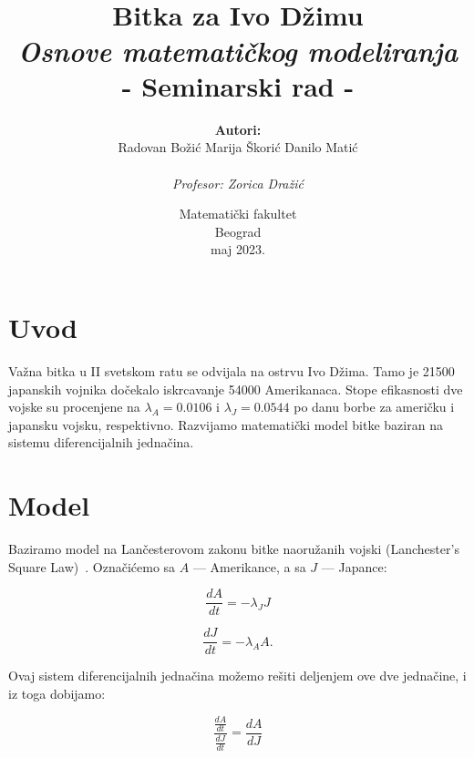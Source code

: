 \documentclass{article}
\title{ \normalsize \textsc{}
		\\ [2.0cm]
    \HRule{1.5pt} \\ [0.5cm]
		\LARGE \textbf{{Bitka za Ivo Džimu}}
    \HRule{1.5pt} \\[5pt] 
        \textit{Osnove matematičkog modeliranja} \\
        {- Seminarski rad -}\vspace*{9\baselineskip}
		}
\date{Matematički fakultet \\ Beograd \\ maj 2023.}
\author{\textbf{Autori:} \\[5pt]
    \Large{Radovan Božić \qquad Marija Škorić \qquad Danilo Matić} \\ \\
  \textit{Profesor: Zorica Dražić}}
\begin{document}

\maketitle
\thispagestyle{empty}
\newpage

\tableofcontents
{}
\newpage


\section{Uvod}

\hspace*{5mm}
Važna bitka u II svetskom ratu se odvijala na ostrvu Ivo Džima. Tamo je 21500
japanskih vojnika dočekalo iskrcavanje 54000 Amerikanaca.  Stope efikasnosti dve
vojske su procenjene na \(\lambda_A = 0.0106\) i \(\lambda_J = 0.0544\) po danu
borbe za američku i japansku vojsku, respektivno. Razvijamo matematički model
bitke baziran na sistemu diferencijalnih jednačina.



\section{Model}

\hspace*{5mm}
Baziramo model na Lančesterovom zakonu bitke naoružanih vojski (Lanchester’s
Square Law)~\cite{wiki}. Označićemo sa \(A\) --- Amerikance, a sa \(J\) --- Japance:

\begin{equation}\label{pocetna_A}
\frac{dA}{dt} = - \lambda_{J}J
\end{equation}

\begin{equation}\label{pocetna_J}
\frac{dJ}{dt} = - \lambda_{A}A.
\end{equation}

Ovaj sistem diferencijalnih jednačina možemo rešiti deljenjem ove dve jednačine,
i iz toga dobijamo:

\[
  \frac{\displaystyle \frac{\displaystyle dA}{\displaystyle dt}}{\displaystyle  \frac{\displaystyle dJ}{\displaystyle dt} } = \frac{\displaystyle dA}{\displaystyle dJ}
\]
\end{document}
